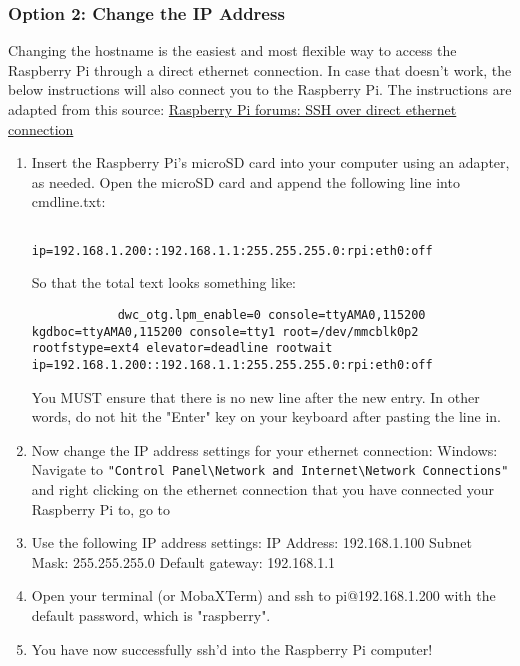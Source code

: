 \documentclass{article}
\begin{document}
	\subsubsection{Option 2: Change the IP Address}
	Changing the hostname is the easiest and most flexible way to access the Raspberry Pi through a direct ethernet connection. In case that doesn't work, the below instructions will also connect you to the Raspberry Pi.
	The instructions are adapted from this source: \href{https://www.raspberrypi.org/forums/viewtopic.php?f=91&t=24993}{Raspberry Pi forums: SSH over direct ethernet connection}
		\begin{enumerate}
			\item Insert the Raspberry Pi's microSD card into your computer using an adapter, as needed. Open the microSD card and append the following line into cmdline.txt:
			\begin{lstlisting}
			ip=192.168.1.200::192.168.1.1:255.255.255.0:rpi:eth0:off
			\end{lstlisting}
			So that the total text looks something like: 
			\begin{lstlisting}
			dwc_otg.lpm_enable=0 console=ttyAMA0,115200 kgdboc=ttyAMA0,115200 console=tty1 root=/dev/mmcblk0p2 rootfstype=ext4 elevator=deadline rootwait ip=192.168.1.200::192.168.1.1:255.255.255.0:rpi:eth0:off
			\end{lstlisting}
			You MUST ensure that there is no new line after the new entry. In other words, do not hit the "Enter" key on your keyboard after pasting the line in.
			\item Now change the IP address settings for your ethernet connection:
			\subitem Windows: Navigate to \verb+"Control Panel\Network and Internet\Network Connections"+ and right clicking on the ethernet connection that you have connected your Raspberry Pi to, go to 
			\item Use the following IP address settings:
			\subitem IP Address: 192.168.1.100
			\subitem Subnet Mask: 255.255.255.0
			\subitem Default gateway: 192.168.1.1
			\item Open your terminal (or MobaXTerm) and ssh to pi@192.168.1.200 with the default password, which is "raspberry". 
			\item You have now successfully ssh'd into the Raspberry Pi computer! 

\end{enumerate}
\end{document}

